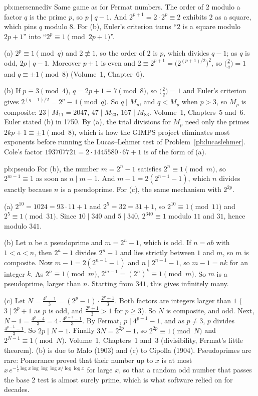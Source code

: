 \begin{solution}{pb:mersennediv}
\idea Same game as for Fermat numbers. The order of $2$ modulo a factor $q$ is the prime $p$, so $p\mid q-1$. And
$2^{p+1}=2\cdot2^p\equiv2$ exhibits $2$ as a square, which pins $q$ modulo $8$. For (b), Euler's criterion turns
``$2$ is a square modulo $2p+1$'' into ``$2^p\equiv1\pmod{2p+1}$''.

\writeup (a) $2^p\equiv1\pmod q$ and $2\not\equiv1$, so the order of $2$ is $p$, which divides $q-1$; as $q$ is odd, $2p\mid q-1$.
Moreover $p+1$ is even and $2\equiv2^{p+1}=\bigl(2^{(p+1)/2}\bigr)^2$, so $\bigl(\frac2q\bigr)=1$ and $q\equiv\pm1\pmod8$
(Volume~1, Chapter~6).

(b) If $p\equiv3\pmod4$, $q=2p+1\equiv7\pmod8$, so $\bigl(\frac2q\bigr)=1$ and Euler's criterion gives $2^{(q-1)/2}=2^p\equiv1\pmod q$. So
$q\mid M_p$, and $q<M_p$ when $p>3$, so $M_p$ is composite: $23\mid M_{11}=2047$, $47\mid M_{23}$, $167\mid M_{83}$.
\tools Volume~1, Chapters~5 and~6.
\leads Euler stated (b) in 1750. By (a), the trial divisions for $M_p$ need only the primes $2kp+1\equiv\pm1\pmod8$, which is
how the GIMPS project eliminates most exponents before running the Lucas--Lehmer test of Problem~\ref{pb:lucaslehmer}. Cole's
factor $193707721=2\cdot1445580\cdot67+1$ is of the form of (a).
\end{solution}

\begin{solution}{pb:pseudo}
\idea For (b), the number $m=2^n-1$ satisfies $2^n\equiv1\pmod m$, so $2^{m-1}\equiv1$ as soon as $n\mid m-1$. And
$m-1=2(2^{n-1}-1)$, which $n$ divides exactly because $n$ is a pseudoprime. For (c), the same mechanism with $2^{2p}$.

\writeup (a) $2^{10}=1024=93\cdot11+1$ and $2^5=32=31+1$, so $2^{10}\equiv1\pmod{11}$ and $2^5\equiv1\pmod{31}$. Since $10\mid340$ and
$5\mid340$, $2^{340}\equiv1$ modulo $11$ and $31$, hence modulo $341$.

(b) Let $n$ be a pseudoprime and $m=2^n-1$, which is odd. If $n=ab$ with $1<a<n$, then $2^a-1$ divides $2^n-1$ and lies strictly
between $1$ and $m$, so $m$ is composite. Now $m-1=2(2^{n-1}-1)$ and $n\mid2^{n-1}-1$, so $m-1=nk$ for an integer $k$. As
$2^n\equiv1\pmod m$, $2^{m-1}=(2^n)^k\equiv1\pmod m$. So $m$ is a pseudoprime, larger than $n$. Starting from $341$, this gives
infinitely many.

(c) Let $N=\frac{4^p-1}3=(2^p-1)\cdot\frac{2^p+1}3$. Both factors are integers
larger than $1$ ($3\mid2^p+1$ as $p$ is odd, and $\frac{2^p+1}3>1$ for $p\ge3$). So $N$ is composite, and odd. Next,
$N-1=\frac{4^p-4}3=4\cdot\frac{4^{p-1}-1}3$. By Fermat, $p\mid4^{p-1}-1$, and as $p\ne3$, $p$ divides $\frac{4^{p-1}-1}3$. So $2p\mid N-1$.
Finally $3N=2^{2p}-1$, so $2^{2p}\equiv1\pmod N$ and $2^{N-1}\equiv1\pmod N$.
\tools Volume~1, Chapters~1 and~3 (divisibility, Fermat's little theorem).
\leads (b) is due to Malo (1903) and (c) to Cipolla (1904). Pseudoprimes are rare: Pomerance proved that their number up to $x$
is at most $x\,e^{-\frac12\log x\log\log\log x/\log\log x}$ for large $x$, so that a random odd number that passes the base $2$
test is almost surely prime, which is what software relied on for decades.
\end{solution}

